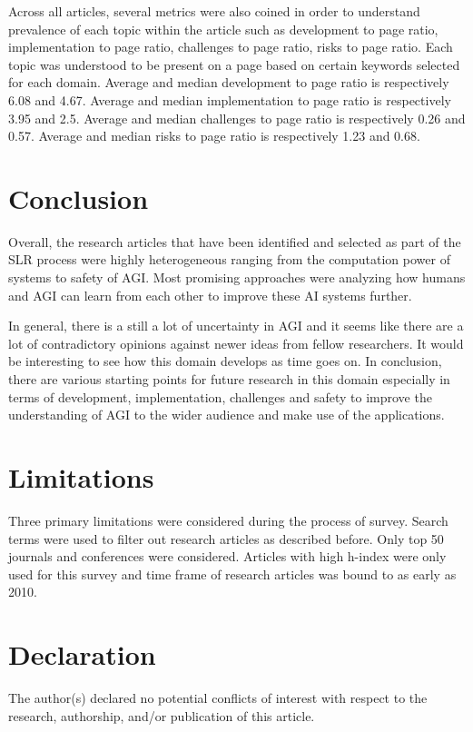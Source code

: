 \documentclass{article}
\begin{document}
Across all articles, several metrics were also coined in order to understand prevalence of each topic within the article such as development to page ratio, implementation to page ratio, challenges to page ratio, risks to page ratio. Each topic was understood to be present on a page based on certain keywords selected for each domain.
Average and median development to page ratio is respectively 6.08 and 4.67.
Average and median implementation to page ratio is respectively 3.95 and 2.5.
Average and median challenges to page ratio is respectively 0.26 and 0.57.
Average and median risks to page ratio is respectively 1.23 and 0.68.


\section{Conclusion}
Overall, the research articles that have been identified and selected as part of the SLR process were highly heterogeneous ranging from the computation power of systems to safety of AGI. Most promising approaches were analyzing how humans and AGI can learn from each other to improve these AI systems further. 

In general, there is a still a lot of uncertainty in AGI and it seems like there are a lot of contradictory opinions against newer ideas from fellow researchers. It would be interesting to see how this domain develops as time goes on. In conclusion, there are various starting points for future research in this domain especially in terms of development, implementation, challenges and safety to improve the understanding of AGI to the wider audience and make use of the applications.

\section{Limitations}

Three primary limitations were considered during the process of survey. Search terms were used to filter out research articles as described before. Only top 50 journals and conferences were considered. Articles with high h-index were only used for this survey and time frame of research articles was bound to as early as 2010.

\section{Declaration}

The author(s) declared no potential conflicts of interest with respect to the research, authorship, and/or publication of this article.
\end{document}
